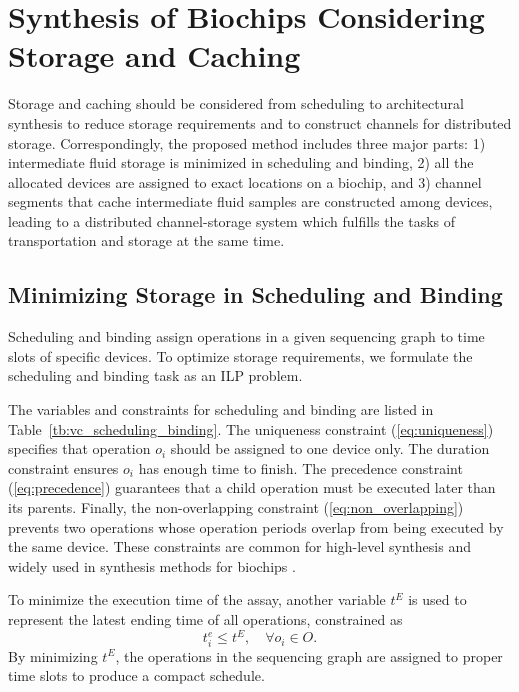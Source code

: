 
\section{Synthesis of Biochips Considering Storage and Caching}
\label{sec:storage_synthesis}

Storage and caching should be considered from scheduling to architectural synthesis
to reduce storage requirements and to construct channels for distributed
storage.
Correspondingly, the proposed method includes three major parts:
1) intermediate fluid storage is minimized in scheduling and binding,
2) all the allocated devices are assigned to exact locations on a biochip, and 3) channel segments that cache intermediate fluid samples are constructed among devices, leading to a
distributed channel-storage system which fulfills the tasks of transportation and storage at the same time.

\subsection{Minimizing Storage in Scheduling and Binding}
\label{sec:scheduling_binding}

Scheduling and binding assign operations in a given sequencing graph
to time slots of specific devices.
To optimize storage requirements,
we formulate the scheduling and binding task as
an ILP problem. %

The variables and constraints for scheduling and binding are listed in
Table~\ref{tb:vc_scheduling_binding}. The uniqueness constraint (\ref{eq:uniqueness})
specifies that operation $o_i$ should be assigned
to one device only. The duration constraint ensures
$o_i$ has enough time to finish.
The precedence constraint (\ref{eq:precedence}) guarantees that a child
operation must be executed later than its parents. Finally, the
non-overlapping constraint (\ref{eq:non_overlapping}) prevents two operations
whose operation periods overlap from being executed by the same device.
These constraints are common for high-level synthesis and
widely used in synthesis methods for biochips \cite{SuCh04}.

To minimize the execution time of the assay, another variable $t^E$ is
used to represent
the latest ending time of all operations, constrained as
\begin{equation}\label{eq:latest_finishing}
t^e_i \le t^E,  \quad \forall o_i\in O.
\end{equation}
\vskip 7pt
By minimizing $t^E$, the operations in the sequencing graph
are assigned to proper time slots %
to produce a compact schedule.



